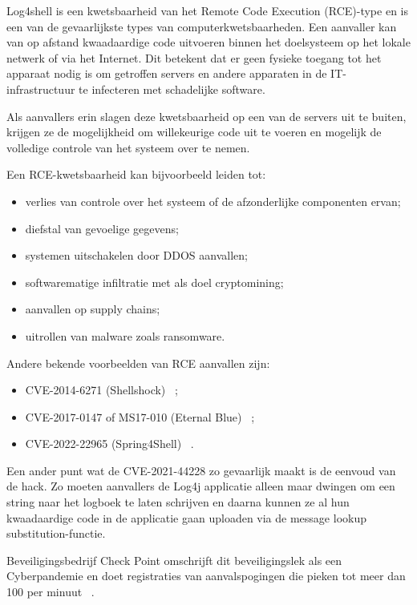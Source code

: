 \documentclass{hogent-article}
\begin{document}
Log4shell is een kwetsbaarheid van het Remote Code Execution (RCE)-type en is een van de gevaarlijkste types van computerkwetsbaarheden. Een aanvaller kan van op afstand kwaadaardige code uitvoeren binnen het doelsysteem op het lokale netwerk of via het Internet. Dit betekent dat er geen fysieke toegang tot het apparaat nodig is om getroffen servers en andere apparaten in de IT-infrastructuur te infecteren met schadelijke software.

Als aanvallers erin slagen deze kwetsbaarheid op een van de servers uit te buiten, krijgen ze de mogelijkheid om willekeurige code uit te voeren en mogelijk de volledige controle van het systeem over te nemen.

Een RCE-kwetsbaarheid kan bijvoorbeeld leiden tot:
    \begin{itemize}[leftmargin=*]
    \item verlies van controle over het systeem of de afzonderlijke componenten ervan;
    \item diefstal van gevoelige gegevens;
    \item systemen uitschakelen door DDOS aanvallen;
    \item softwarematige infiltratie met als doel cryptomining;
    \item aanvallen op supply chains;
    \item uitrollen van malware zoals ransomware.
\end{itemize}

Andere bekende voorbeelden van RCE aanvallen zijn:
\begin{itemize}[leftmargin=*]
    \item CVE-2014-6271 (Shellshock) ~\autocite{Debian2021};
    \item CVE-2017-0147 of MS17-010 (Eternal Blue) ~\autocite{Microsoft2022};
    \item CVE-2022-22965 (Spring4Shell) ~\autocite{VMware2022}.
\end{itemize}

Een ander punt wat de CVE-2021-44228 zo gevaarlijk maakt is de eenvoud van de hack. Zo moeten aanvallers de Log4j applicatie alleen maar dwingen om een string naar het logboek te laten schrijven en daarna kunnen ze al hun kwaadaardige code in de applicatie gaan uploaden via de message lookup substitution-functie.

Beveiligingsbedrijf Check Point omschrijft dit beveiligingslek als een Cyberpandemie en doet registraties van aanvalspogingen die pieken tot meer dan 100 per minuut ~\autocite{Checkpoint2021}.
\end{document}
